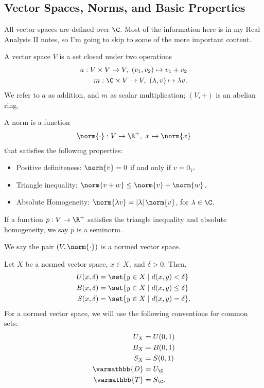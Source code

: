 \documentclass[10pt]{mypackage}
\renewcommand*{\mathbb}[1]{\varmathbb{#1}}
\begin{document}
\subsection{Vector Spaces, Norms, and Basic Properties}%
All vector spaces are defined over $\C$. Most of the information here is in my Real Analysis II notes, so I'm going to skip to some of the more important content.
\begin{definition}
  A vector space $V$ is a set closed under two operations
  \begin{align*}
    a: V\times V \rightarrow V,~\left(v_1,v_2\right)\mapsto v_1 + v_2\\
    m: \C\times V\rightarrow V,~\left(\lambda,v\right) \mapsto \lambda v.
  \end{align*}
  We refer to $a$ as addition, and $m$ as scalar multiplication; $(V,+)$ is an abelian ring.
\end{definition}
\begin{definition}[Norm]
  A norm is a function
  \begin{align*}
    \norm{\cdot}: V \rightarrow \R^+,~x\mapsto \norm{x}
  \end{align*}
  that satisfies the following properties:
  \begin{itemize}
    \item Positive definiteness: $\norm{v} = 0$ if and only if $v = 0_V$.
    \item Triangle inequality: $\norm{v+w} \leq \norm{v} + \norm{w}$.
    \item Absolute Homogeneity: $\norm{\lambda v} = \left\vert \lambda \right\vert\norm{v}$, for $\lambda \in \C$.
  \end{itemize}
  If a function $p: V\rightarrow \R^+$ satisfies the triangle inequality and absolute homogeneity, we say $p$ is a seminorm.
\end{definition}
We say the pair $\left(V,\norm{\cdot}\right)$ is a normed vector space.
\begin{definition}
  Let $X$ be a normed vector space, $x\in X$, and $\delta > 0$. Then,
  \begin{align*}
    U(x,\delta) &= \set{y\in X\mid d(x,y) < \delta}\\
    B(x,\delta) &= \set{y\in X\mid d(x,y) \leq \delta}\\
    S(x,\delta) &= \set{y\in X\mid d(x,y) = \delta}.
  \end{align*}
  For a normed vector space, we will use the following conventions for common sets:
  \begin{align*}
    U_X &= U(0,1)\\
    B_X &= B(0,1)\\
    S_X &= S(0,1)\\
    \mathbb{D} &= U_{\C}\\
    \mathbb{T} &= S_{\C}.
  \end{align*}
\end{definition}
\end{document}
